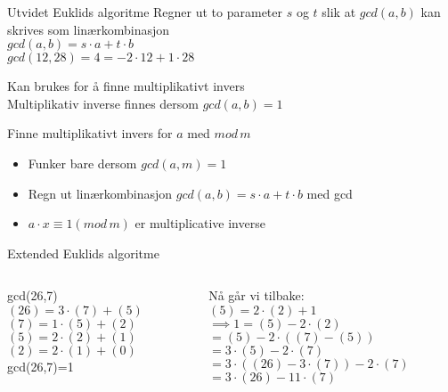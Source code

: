 \begin{frame}[fragile]{}
\begin{block}{Utvidet Euklids algoritme}
Regner ut to parameter $s$ og $t$ slik at $gcd(a,b)$ kan skrives som linærkombinasjon\\
$gcd(a,b)=s\cdot a+t\cdot b$\\
$gcd(12,28)=4=-2\cdot 12 + 1\cdot 28$\medskip

Kan brukes for å finne multiplikativt invers\\
Multiplikativ inverse finnes dersom $gcd(a,b)=1$
\end{block}
\pause

\begin{block}{Finne multiplikativt invers for $a$ med $mod\, m$}
\begin{itemize}
\item Funker bare dersom $gcd(a,m)=1$\\
\item Regn ut linærkombinasjon $gcd(a,b)=s\cdot a+t\cdot b$ med gcd
\item $a\cdot x \equiv 1 (mod\, m)$ er multiplicative inverse
\end{itemize}
\end{block}
\end{frame}

\begin{frame}{Extended Euklids algoritme}
    \begin{columns}
        \begin{column}{0.45\textwidth}
             gcd(26,7)\\
             
             $(26)=3\cdot (7)+(5)$\\
             $(7)=1\cdot (5)+(2)$\\
             $(5)=2\cdot(2)+(1)$\\
             $(2)=2\cdot(1)+(0)$\\
             
             gcd(26,7)=1
        \end{column}
        \pause
        \begin{column}{0.45\textwidth}
            Nå går vi tilbake:\\
            $(5)=2\cdot(2)+1$\\
            
            $\implies 1=(5)-2\cdot (2)$\\
            $=(5)-2\cdot ((7)-(5))$\\
            $=3\cdot (5)-2\cdot(7)$\\
            $=3\cdot ((26)-3\cdot (7))-2\cdot (7)$\\
            $=3\cdot (26)-11\cdot (7)$
        \end{column}
    \end{columns}
\end{frame}


